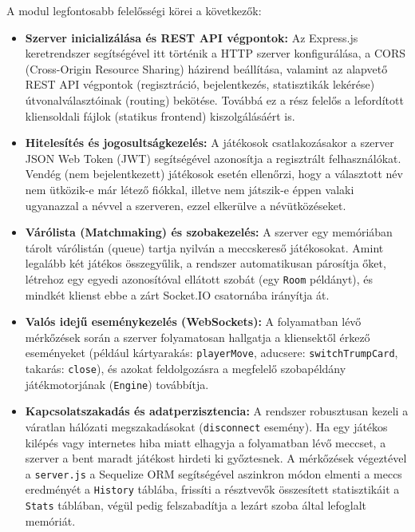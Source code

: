 A modul legfontosabb felelősségi körei a következők:

\begin{itemize}
    \item \textbf{Szerver inicializálása és REST API végpontok:} Az Express.js keretrendszer segítségével itt történik a HTTP szerver konfigurálása, a CORS (Cross-Origin Resource Sharing) házirend beállítása, valamint az alapvető REST API végpontok (regisztráció, bejelentkezés, statisztikák lekérése) útvonalválasztóinak (routing) bekötése. Továbbá ez a rész felelős a lefordított kliensoldali fájlok (statikus frontend) kiszolgálásáért is.
    
    \item \textbf{Hitelesítés és jogosultságkezelés:} A játékosok csatlakozásakor a szerver JSON Web Token (JWT) segítségével azonosítja a regisztrált felhasználókat. Vendég (nem bejelentkezett) játékosok esetén ellenőrzi, hogy a választott név nem ütközik-e már létező fiókkal, illetve nem játszik-e éppen valaki ugyanazzal a névvel a szerveren, ezzel elkerülve a névütközéseket.
    
    \item \textbf{Várólista (Matchmaking) és szobakezelés:} A szerver egy memóriában tárolt várólistán (queue) tartja nyilván a meccskereső játékosokat. Amint legalább két játékos összegyűlik, a rendszer automatikusan párosítja őket, létrehoz egy egyedi azonosítóval ellátott szobát (egy \texttt{Room} példányt), és mindkét klienst ebbe a zárt Socket.IO csatornába irányítja át.
    
    \item \textbf{Valós idejű eseménykezelés (WebSockets):} A folyamatban lévő mérkőzések során a szerver folyamatosan hallgatja a kliensektől érkező eseményeket (például kártyarakás: \texttt{playerMove}, aducsere: \texttt{switchTrumpCard}, takarás: \texttt{close}), és azokat feldolgozásra a megfelelő szobapéldány játékmotorjának (\texttt{Engine}) továbbítja.
    
    \item \textbf{Kapcsolatszakadás és adatperzisztencia:} A rendszer robusztusan kezeli a váratlan hálózati megszakadásokat (\texttt{disconnect} esemény). Ha egy játékos kilépés vagy internetes hiba miatt elhagyja a folyamatban lévő meccset, a szerver a bent maradt játékost hirdeti ki győztesnek. A mérkőzések végeztével a \texttt{server.js} a Sequelize ORM segítségével aszinkron módon elmenti a meccs eredményét a \texttt{History} táblába, frissíti a résztvevők összesített statisztikáit a \texttt{Stats} táblában, végül pedig felszabadítja a lezárt szoba által lefoglalt memóriát.
\end{itemize}

